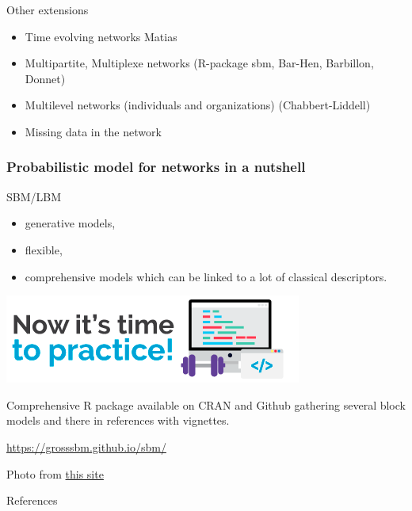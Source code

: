 \documentclass[compress,10pt]{beamer}
\begin{document}
\begin{frame}{Other extensions}

\begin{itemize}
\item  Time evolving networks \textcolor{mygreen}{Matias} 
\item  Multipartite, Multiplexe networks (\textcolor{mygreen}{R-package  sbm, Bar-Hen, Barbillon, Donnet}) 
\item Multilevel networks (individuals and organizations)  (\textcolor{mygreen}{Chabbert-Liddell})
 \item Missing data in the network \textcolor{mygreen}{\cite{tabouy2019variational}}
\end{itemize}
\end{frame}


\begin{frame}
 \frametitle{Probabilistic model for networks in a nutshell} 

 SBM/LBM
 \begin{itemize}
  \item generative models,
  \item flexible,
  \item comprehensive models which can be linked to a lot of classical descriptors.
  
 \end{itemize}
\end{frame}

\begin{frame}
\begin{center}
\includegraphics[width=0.5 \textwidth]{plots/PRACTICE-TIME}
\end{center}
  



Comprehensive R package available on CRAN and Github gathering several block models and there in references with vignettes.  

\href{https://grosssbm.github.io/sbm/}{\textcolor{dgreen}{https://grosssbm.github.io/sbm/}}




{ \footnotesize Photo from \href{http://androiddeveloper.galileo.edu/android-tutorial/time-to-practice-java-for-android-development/}{this site}}


\end{frame}




\begin{frame}[allowframebreaks]{References}

 \small{}
  \end{frame}
  
  
  
\end{document}
